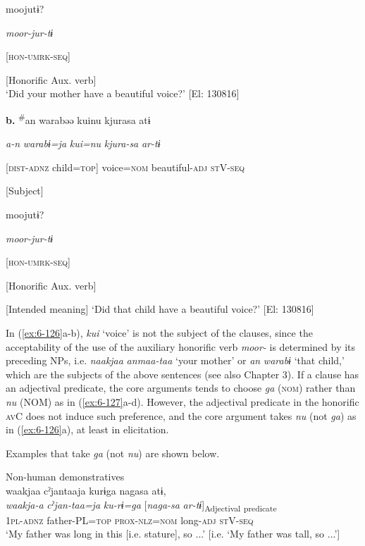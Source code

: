 \begin{table}
\begin{styleBeschriftung}
      [Subject]      

      moojutɨ?

      \textit{moor-jur-tɨ}

      [\textsc{hon}-\textsc{umrk}-\textsc{seq}]

      [Honorific Aux. verb]\\
\glt ‘Did your mother have a beautiful voice?’ [El: 130816]

  \textbf{b.}  {\TM}  \textsuperscript{\#}an  warabəə  kuinu  kjurasa  atɨ

       \textit{a-n}  \textit{warabɨ=ja}  \textit{kui=nu}  \textit{kjura-sa}  \textit{ar-tɨ}

       [\textsc{dist}-\textsc{adnz}  child=\textsc{top}]  voice=\textsc{nom}  beautiful-\textsc{adj}  \textsc{st}V-\textsc{seq}

       [Subject]      

      moojutɨ?

      \textit{moor-jur-tɨ}

      [\textsc{hon}-\textsc{umrk}-\textsc{seq}]

      [Honorific Aux. verb]

      [Intended meaning] ‘Did that child have a beautiful voice?’ [El: 130816]

In (\ref{ex:6-126}a-b), \textit{kui} ‘voice’ is not the subject of the clauses, since the acceptability of the use of the auxiliary honorific verb \textit{moor-} is determined by its preceding NPs, i.e. \textit{naakjaa} \textit{anmaa-taa} ‘your mother’ or \textit{an} \textit{warabɨ} ‘that child,’ which are the subjects of the above sentences (see also Chapter 3). If a clause has an adjectival predicate, the core arguments tends to choose \textit{ga} (\textsc{nom}) rather than \textit{nu} (NOM) as in (\ref{ex:6-127}a-d). However, the adjectival predicate in the honorific \textsc{av}C does not induce such preference, and the core argument takes \textit{nu} (not \textit{ga}) as in (\ref{ex:6-126}a), at least in elicitation.

Examples that take \textit{ga} (not \textit{nu}) are shown below.

\ea\label{ex:6-127}
 Non-human demonstratives\\

 \ea {\TM}  waakjaa  cˀjantaaja  kurɨga  nagasa  atɨ,\\
\glll \textit{waakja-a}  \textit{cˀjan-taa=ja}  \textit{ku-rɨ=ga}  [\textit{naga-sa}  \textit{ar-tɨ}]\textsubscript{Adjectival} \textsubscript{predicate}\\
1\textsc{pl}-\textsc{adnz}  father-PL=\textsc{top}  \textsc{prox}-\textsc{nlz}=\textsc{nom}  long-\textsc{adj}  \textsc{st}V-\textsc{seq}\\
\glt ‘My father was long in this [i.e. stature], so ...’ [i.e. ‘My father was tall, so ...’]


\end{styleBeschriftung}
\end{table}
